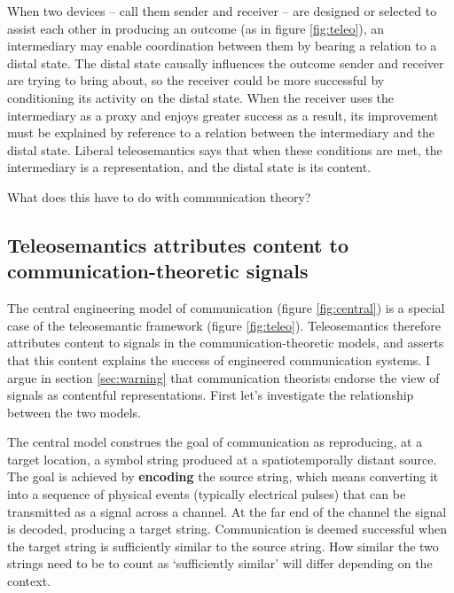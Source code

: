 \documentclass[12pt]{article}
\begin{document}
When two devices -- call them sender and receiver -- are designed or selected to assist each other in producing an outcome (as in figure \ref{fig:teleo}), an intermediary may enable coordination between them by bearing a relation to a distal state.
The distal state causally influences the outcome sender and receiver are trying to bring about, so the receiver could be more successful by conditioning its activity on the distal state.
When the receiver uses the intermediary as a proxy and enjoys greater success as a result, its improvement must be explained by reference to a relation between the intermediary and the distal state.
Liberal teleosemantics says that when these conditions are met, the intermediary is a representation, and the distal state is its content.

What does this have to do with communication theory?

\subsection{Teleosemantics attributes content to communication-theoretic signals}

The central engineering model of communication (figure \ref{fig:central}) is a special case of the teleosemantic framework (figure \ref{fig:teleo}).
Teleosemantics therefore attributes content to signals in the communication-theoretic models, and asserts that this content explains the success of engineered communication systems.
I argue in section \ref{sec:warning} that communication theorists endorse the view of signals as contentful representations.
First let's investigate the relationship between the two models.

The central model construes the goal of communication as reproducing, at a target location, a symbol string produced at a spatiotemporally distant source.
The goal is achieved by \textbf{encoding} the source string, which means converting it into a sequence of physical events (typically electrical pulses) that can be transmitted as a signal across a channel.
At the far end of the channel the signal is decoded, producing a target string.
Communication is deemed successful when the target string is sufficiently similar to the source string.
How similar the two strings need to be to count as `sufficiently similar' will differ depending on the context.
\end{document}
